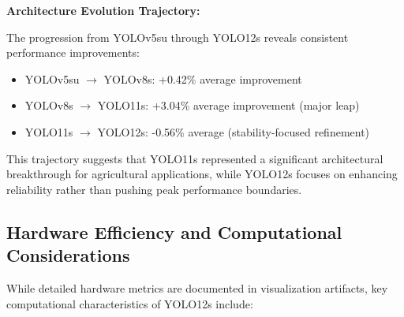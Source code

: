 \begin{table}[htbp]
\centering
\caption{Comprehensive Multi-Architecture Performance Comparison}
\label{tab:multi_arch_comparison}
\end{table}

\textbf{Architecture Evolution Trajectory:}

The progression from YOLOv5su through YOLO12s reveals consistent performance improvements:
\begin{itemize}
    \item YOLOv5su $\rightarrow$ YOLOv8s: +0.42\% average improvement
    \item YOLOv8s $\rightarrow$ YOLO11s: +3.04\% average improvement (major leap)
    \item YOLO11s $\rightarrow$ YOLO12s: -0.56\% average (stability-focused refinement)
\end{itemize}

This trajectory suggests that YOLO11s represented a significant architectural breakthrough for agricultural applications, while YOLO12s focuses on enhancing reliability rather than pushing peak performance boundaries.

\subsection{Hardware Efficiency and Computational Considerations}

While detailed hardware metrics are documented in visualization artifacts, key computational characteristics of YOLO12s include:

